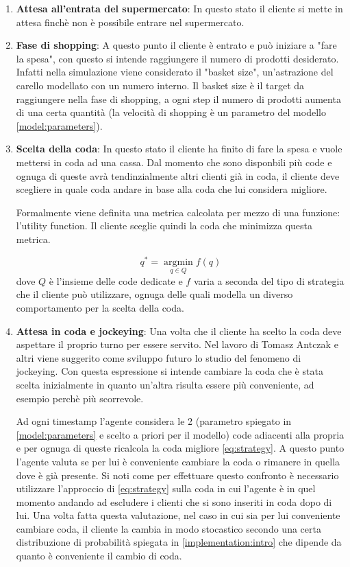 \begin{enumerate}
	\item \textbf{Attesa all'entrata del supermercato}: In questo stato il cliente si mette in attesa finchè non è possibile entrare nel supermercato. 
	\item \textbf{Fase di shopping}: A questo punto il cliente è entrato e può iniziare a "fare la spesa", con questo si intende raggiungere il numero di prodotti desiderato. Infatti nella simulazione viene considerato il "basket size", un'astrazione del carello modellato con un numero interno. Il basket size è il target da raggiungere nella fase di shopping, a ogni step il numero di prodotti aumenta di una certa quantità (la velocità di shopping è un parametro del modello \autoref{model:parameters}). 
	\item \textbf{Scelta della coda}: In questo stato il cliente ha finito di fare la spesa e vuole mettersi in coda ad una cassa. Dal momento che sono disponbili più code e ognuga di queste avrà tendinzialmente altri clienti già in coda, il cliente deve scegliere in quale coda andare in base alla coda che lui considera migliore.
	
	Formalmente viene definita una metrica calcolata per mezzo di una funzione: l'utility function. Il cliente sceglie quindi la coda che minimizza questa metrica.

	\begin{equation}
		q^* = \operatorname*{argmin}_{q \in Q} f(q) \label{eq:strategy}
	\end{equation}
	dove $Q$ è l'insieme delle code dedicate e $f$ varia a seconda del tipo di strategia che il cliente può utilizzare, ognuga delle quali modella un diverso comportamento per la scelta della coda.

	\item \textbf{Attesa in coda e jockeying}:  Una volta che il cliente ha scelto la coda deve aspettare il proprio turno per essere servito. Nel lavoro di Tomasz Antczak e altri \cite{article1} viene suggerito come sviluppo futuro lo studio del fenomeno di jockeying. Con questa espressione si intende cambiare la coda che è stata scelta inizialmente in quanto un'altra risulta essere più conveniente, ad esempio perchè più scorrevole.
	
	Ad ogni timestamp l'agente considera le 2 (parametro spiegato in \autoref{model:parameters} e scelto a priori per il modello) code adiacenti alla propria  e per ognuga di queste ricalcola la coda migliore \autoref{eq:strategy}. A questo punto l'agente valuta se per lui è conveniente cambiare la coda o rimanere in quella dove è già presente. Si noti come per effettuare questo confronto è necessario utilizzare l'approccio di \autoref{eq:strategy} sulla coda in cui l'agente è in quel momento andando ad escludere i clienti che si sono inseriti in coda dopo di lui. Una volta fatta questa valutazione, nel caso in cui sia per lui conveniente cambiare coda, il cliente la cambia in modo stocastico secondo una certa distribuzione di probabilità spiegata in \autoref{implementation:intro} che dipende da quanto è conveniente il cambio di coda.
	

\end{enumerate}
